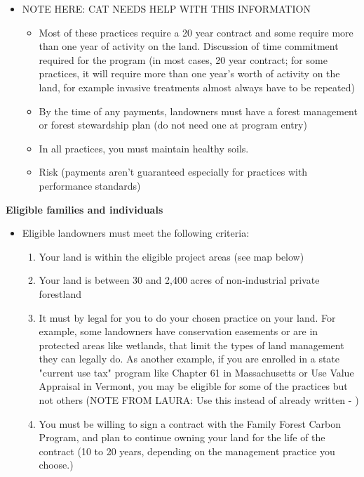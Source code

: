 \documentclass{article}\usepackage[]{graphicx}\usepackage[]{color}
\begin{document}
\begin{itemize}
  \item NOTE HERE: CAT NEEDS HELP WITH THIS INFORMATION
  \begin{itemize}
    \item Most of these practices require a 20 year contract and some require more than one year of activity on the land. Discussion of time commitment required for the program (in most cases, 20 year contract; for some practices, it will require more than one year’s worth of activity on the land, for example invasive treatments almost always have to be repeated)
    \item By the time of any payments, landowners must have a forest management or forest stewardship plan (do not need one at program entry)
    \item In all practices, you must maintain healthy soils.
    \item Risk (payments aren't guaranteed especially for practices with performance standards)
  \end{itemize}
  \end{itemize}
  
{\Large{\textbf{Eligible families and individuals}}}\\
\begin{itemize}
\item Eligible landowners must meet the following criteria:
  \begin{enumerate}
  \item Your land is within the eligible project areas (see map below)
  \item Your land is between 30 and 2,400 acres of non-industrial private forestland
  \item It must by legal for you to do your chosen practice on your land. For example, some landowners have conservation easements or are in protected areas like wetlands, that limit the types of land management they can legally do. As another example, if you are enrolled in a state "current use tax" program like Chapter 61 in Massachusetts or Use Value Appraisal in Vermont, you may be eligible for some of the practices but not others (NOTE FROM LAURA: Use this instead of already written - )
  \item You must be willing to sign a contract with the Family Forest Carbon Program, and plan to continue owning your land for the life of the contract (10 to 20 years, depending on the management practice you choose.)
  \end{enumerate}
\end{itemize}
\end{document}
